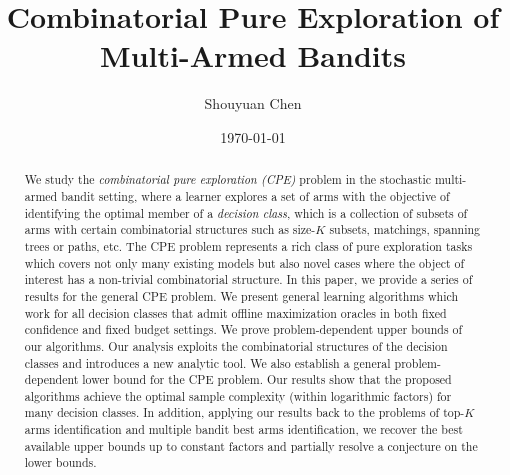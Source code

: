 \documentclass{article}
\title{Combinatorial Pure Exploration of \\ Multi-Armed Bandits}
\author{Shouyuan Chen}
\date{\today}
\newcommand{\wei}[1]{}
\newcommand{\wei}[1]{{\color{blue!50!black}  [\text{Wei:} #1]}}
\newcommand{\Problem}{{CPE}\xspace}
\begin{document}
\newpage

\maketitle
\vspace{-1em}
\begin{abstract}
We study the {\em combinatorial pure exploration (CPE)} problem in the stochastic multi-armed bandit setting, where a learner explores a set of arms with the objective of identifying the optimal member of a \emph{decision class}, which is a collection of subsets of arms with certain combinatorial structures such as size-$K$ subsets, matchings, spanning trees or paths, etc. The CPE problem represents a rich class of pure exploration tasks which covers not only many existing models but also novel cases where the object of interest has a non-trivial combinatorial structure. In this paper, we provide a series of results for the general CPE problem. We present general learning algorithms which work for all decision classes that admit offline maximization oracles in both fixed confidence and fixed budget settings. We prove problem-dependent upper bounds of our algorithms. Our analysis exploits the combinatorial structures of the decision classes and introduces a new analytic tool. We also establish a general problem-dependent lower bound for the CPE problem. Our results show that the proposed algorithms achieve the optimal sample complexity (within logarithmic factors) for many decision classes. In addition, applying our results back to the problems of top-$K$ arms identification and multiple bandit best arms identification, we recover the best available upper bounds up to constant factors and partially resolve a conjecture on the lower bounds.





\end{abstract}
\end{document}
